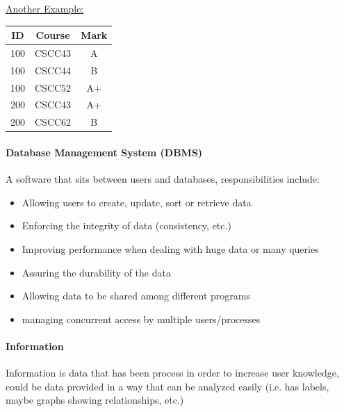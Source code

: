 \documentclass[12pt]{article}
\begin{document}
\underline{Another Example:}

\begin{center}
 \begin{tabular}{||c c c||} 
 \hline
 ID & Course & Mark \\ [0.5ex] 
 \hline\hline
 100 & CSCC43 & A \\ 
 \hline
 100 & CSCC44 & B \\
 \hline
 100 & CSCC52 & A+  \\
 \hline
 200 & CSCC43 & A+\\
 \hline
 200 & CSCC62 & B\\ [1ex] 
 \hline
\end{tabular}
\end{center}

\paragraph{Database Management System (DBMS)} A software that sits between users and databases, responsibilities include:
\begin{itemize}
	\item{Allowing users to create, update, sort or retrieve data}
	\item{Enforcing the integrity of data (consistency, etc.)}
	\item{Improving performance when dealing with huge data or many queries}
	\item{Assuring the durability of the data}
	\item{Allowing data to be shared among different programs}
	\item{managing concurrent access by multiple users/processes}
\end{itemize}

\paragraph{Information} Information is data that has been process in order to increase user knowledge, could be data provided in a way that can be analyzed easily (i.e. has labels, maybe graphs showing relationships, etc.)
\end{document}
